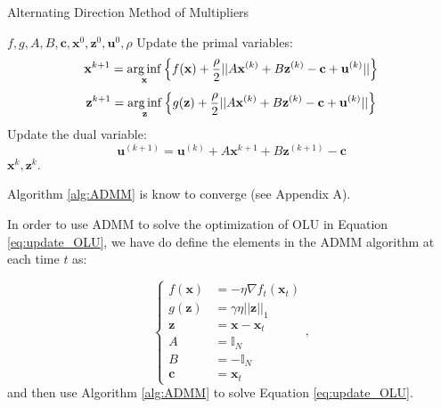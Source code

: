 \begin{algorithm}[!ht]
    \caption{Alternating Direction Method of Multipliers}
    \label{alg:ADMM}
    \begin{algorithmic}[1]
    \REQUIRE $f,g,A,B,\mathbf c,\mathbf x^0,\mathbf z^0,\mathbf u^0,\rho$ \nonumber
    \STATE Update the primal variables: 
    $$\mathbf x^{k+1}=\operatorname*{arg\,inf}\limits_{\mathbf x}\left\{f(\mathbf x)+\frac{\rho}{2}||A\mathbf x^{(k)}+B\mathbf z^{(k)}-\mathbf c+\mathbf u^{(k)}||\right\}$$
    $$\mathbf z^{k+1}=\operatorname*{arg\,inf}\limits_{\mathbf z }\left\{g(\mathbf z)+\frac{\rho}{2}||A\mathbf x^{(k)}+B\mathbf z^{(k)}-\mathbf c+\mathbf u^{(k)}||\right\}$$
    \STATE Update the dual variable: 
    $$\mathbf u^{(k+1)}=\mathbf u^{(k)}+A\mathbf x^{k+1}+B\mathbf z^{(k+1)}-\mathbf c$$
    \ENDWHILE
    \RETURN $\mathbf x^k,\mathbf z^k$. 
    \end{algorithmic}
\end{algorithm}

Algorithm \ref{alg:ADMM} is know to converge (see \cite{boyd2011distributed} Appendix A).

In order to use ADMM to solve the optimization of OLU in Equation \eqref{eq:update_OLU}, we have do define the elements in the ADMM algorithm at each time $t$ as:

\begin{equation}
\begin{cases}
f(\mathbf x)&=-\eta\nabla f_t(\mathbf x_t)\\
g(\mathbf z)&=\gamma\eta||\mathbf z||_1 \\
\mathbf z&=\mathbf x-\mathbf x_t\\
A&=\mathbb I_N\\
B&=-\mathbb I_N\\
\mathbf c&=\mathbf x_t
\end{cases},
\end{equation}
and then use Algorithm \ref{alg:ADMM} to solve Equation \eqref{eq:update_OLU}.





